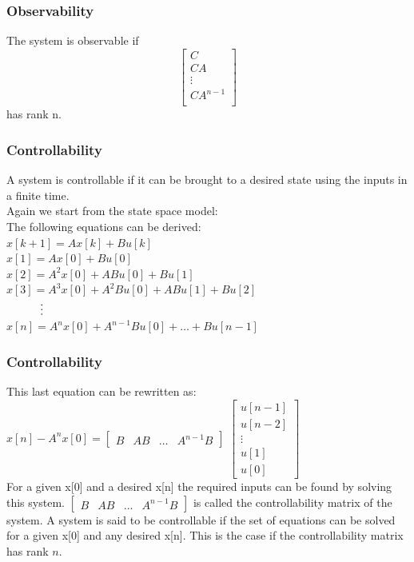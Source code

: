 \begin{frame}
	\frametitle{Observability}
	The system is observable if 
	\[	\begin{bmatrix}
		C\\
		CA\\
		\vdots\\
		CA^{n-1}\\
	\end{bmatrix} \] has rank n.
\end{frame}
\begin{frame}
	\frametitle{Controllability}
	A system is controllable if it can be brought to a desired state using the inputs in a finite time.\\
	Again we start from the state space model:\\
	The following equations can be derived:\\
	$x[k+1] = A x[k] +Bu[k]$\\
	$x[1] = Ax[0]+Bu[0]$\\
	$x[2] = A^2 x[0] + ABu[0] + Bu[1]$\\
	$x[3] = A^3 x[0] + A^2Bu[0]+AB u[1] + Bu[2]$\\
	$ \hspace{3 em}\vdots$\\
	$x[n] = A^{n}x[0]+A^{n-1}Bu[0] + \dots + Bu[n-1]$
\end{frame}
\begin{frame}
	\frametitle{Controllability}
	This last equation can be rewritten as:
	$x[n] - A^{n}x[0] = \begin{bmatrix}
	B & AB & \dots & A^{n-1}B
	\end{bmatrix}$ $
	\begin{bmatrix}
	u[n-1]\\
	u[n-2]\\
	\vdots\\
	u[1]\\
	u[0]
	\end{bmatrix}
	 $	\\
	For a given x[0] and a desired x[n] the required inputs can be found by solving this system.
	$\begin{bmatrix}
		B & AB & \dots & A^{n-1}B
	\end{bmatrix}$ is called the controllability matrix of the system.
	A system is said to be controllable if the set of equations can be solved for a given x[0] and any desired x[n].
	This is the case if the controllability matrix has  rank $n$.
	
\end{frame}

